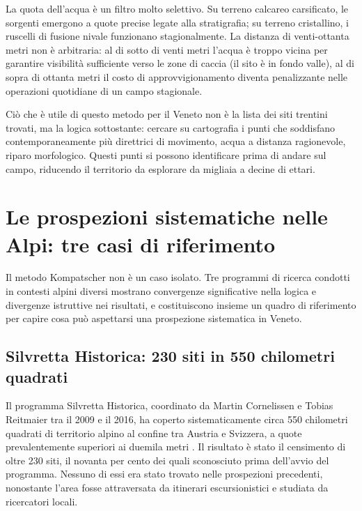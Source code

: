 La quota dell'acqua è un filtro molto selettivo. Su terreno calcareo carsificato, le sorgenti emergono a quote precise legate alla stratigrafia; su terreno cristallino, i ruscelli di fusione nivale funzionano stagionalmente. La distanza di venti-ottanta metri non è arbitraria: al di sotto di venti metri l'acqua è troppo vicina per garantire visibilità sufficiente verso le zone di caccia (il sito è in fondo valle), al di sopra di ottanta metri il costo di approvvigionamento diventa penalizzante nelle operazioni quotidiane di un campo stagionale.

Ciò che è utile di questo metodo per il Veneto non è la lista dei siti trentini trovati, ma la logica sottostante: cercare su cartografia i punti che soddisfano contemporaneamente più direttrici di movimento, acqua a distanza ragionevole, riparo morfologico. Questi punti si possono identificare prima di andare sul campo, riducendo il territorio da esplorare da migliaia a decine di ettari.

\section{Le prospezioni sistematiche nelle Alpi: tre casi di riferimento}

Il metodo Kompatscher non è un caso isolato. Tre programmi di ricerca condotti in contesti alpini diversi mostrano convergenze significative nella logica e divergenze istruttive nei risultati, e costituiscono insieme un quadro di riferimento per capire cosa può aspettarsi una prospezione sistematica in Veneto.

\subsection*{Silvretta Historica: 230 siti in 550 chilometri quadrati}

Il programma Silvretta Historica, coordinato da Martin Cornelissen e Tobias Reitmaier tra il 2009 e il 2016, ha coperto sistematicamente circa 550 chilometri quadrati di territorio alpino al confine tra Austria e Svizzera, a quote prevalentemente superiori ai duemila metri \citep{cornelissen2016}. Il risultato è stato il censimento di oltre 230 siti, il novanta per cento dei quali sconosciuto prima dell'avvio del programma. Nessuno di essi era stato trovato nelle prospezioni precedenti, nonostante l'area fosse attraversata da itinerari escursionistici e studiata da ricercatori locali.

